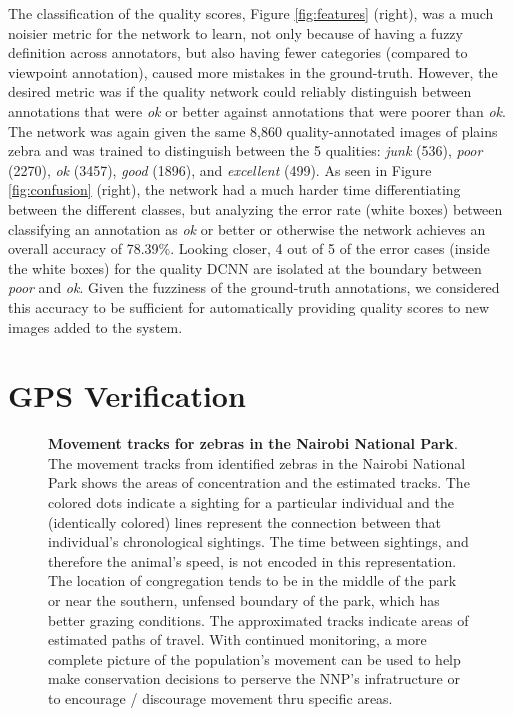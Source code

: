 The classification of the quality scores, Figure \ref{fig:features} (right), was a much noisier metric for the network to learn, not only because of having a fuzzy definition across annotators, but also having fewer categories (compared to viewpoint annotation), caused more mistakes in the ground-truth.   However, the desired metric was if the quality network could reliably distinguish between annotations that were \textit{ok} or better against annotations that were poorer than \textit{ok}.  The network was again given the same 8,860 quality-annotated images of plains zebra and was trained to distinguish between the 5 qualities: \textit{junk} (536), \textit{poor} (2270), \textit{ok} (3457), \textit{good} (1896), and \textit{excellent} (499).  As seen in Figure \ref{fig:confusion} (right), the network had a much harder time differentiating between the different classes, but analyzing the error rate (white boxes) between classifying an annotation as \textit{ok} or better or otherwise the network achieves an overall accuracy of 78.39\%.  Looking closer, 4 out of 5 of the error cases (inside the white boxes) for the quality DCNN are isolated at the boundary between \textit{poor} and \textit{ok}.  Given the fuzziness of the ground-truth annotations, we considered this accuracy to be sufficient for automatically providing quality scores to new images added to the system.

\section{GPS Verification}

\begin{figure}[!htb]%
	\centering
    	\caption[Movement Tracks for Zebras in the Nairobi National Park]{\textbf{Movement tracks for zebras in the Nairobi National Park}.  The movement tracks from identified zebras in the Nairobi National Park shows the areas of concentration and the estimated tracks.  The colored dots indicate a sighting for a particular individual and the (identically colored) lines represent the connection between that individual's chronological sightings.  The time between sightings, and therefore the animal's speed, is not encoded in this representation.  The location of congregation tends to be in the middle of the park or near the southern, unfensed boundary of the park, which has better grazing conditions.  The approximated tracks indicate areas of estimated paths of travel.  With continued monitoring, a more complete picture of the population's movement can be used to help make conservation decisions to perserve the NNP's infratructure or to encourage / discourage movement thru specific areas.}
    	\label{fig:tracks}
\end{figure}

